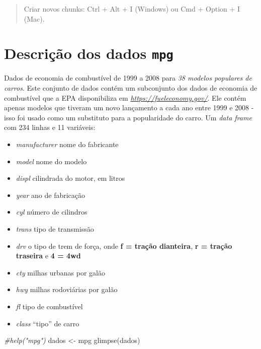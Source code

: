 \documentclass[
]{book}
\newenvironment{Shaded}{\begin{snugshade}}{\end{snugshade}}
\newcommand{\CommentTok}[1]{\textcolor[rgb]{0.56,0.35,0.01}{\textit{#1}}}
\newcommand{\FunctionTok}[1]{\textcolor[rgb]{0.00,0.00,0.00}{#1}}
\newcommand{\NormalTok}[1]{#1}
\newcommand{\OtherTok}[1]{\textcolor[rgb]{0.56,0.35,0.01}{#1}}
\begin{document}
\begin{quote}
Criar novos chunks: Ctrl + Alt + I (Windows) ou Cmd + Option + I (Mac).
\end{quote}

\hypertarget{descriuxe7uxe3o-dos-dados-mpg}{%
\section{\texorpdfstring{Descrição dos dados \texttt{mpg}}{Descrição dos dados mpg}}\label{descriuxe7uxe3o-dos-dados-mpg}}

Dados de economia de combustível de 1999 a 2008 para \emph{38 modelos populares de carros}. Este conjunto de dados contém um subconjunto dos dados de economia de combustível que a EPA disponibiliza em \emph{\url{https://fueleconomy.gov/}}. Ele contém apenas modelos que tiveram um novo lançamento a cada ano entre 1999 e 2008 - isso foi usado como um substituto para a popularidade do carro. Um \emph{data frame} com 234 linhas e 11 variáveis:

\begin{itemize}
\item
  \emph{manufacturer} nome do fabricante
\item
  \emph{model} nome do modelo
\item
  \emph{displ} cilindrada do motor, em litros
\item
  \emph{year} ano de fabricação
\item
  \emph{cyl} número de cilindros
\item
  \emph{trans} tipo de transmissão
\item
  \emph{drv} o tipo de trem de força, onde \textbf{f = tração dianteira}, \textbf{r = tração traseira} e \textbf{4 = 4wd}
\item
  \emph{cty} milhas urbanas por galão
\item
  \emph{hwy} milhas rodoviárias por galão
\item
  \emph{fl} tipo de combustível
\item
  \emph{class} ``tipo'' de carro
\end{itemize}

\begin{Shaded}
\begin{Highlighting}[]
\CommentTok{\#help("mpg")}
\NormalTok{dados }\OtherTok{\textless{}{-}}\NormalTok{ mpg}
\FunctionTok{glimpse}\NormalTok{(dados)}
\end{Highlighting}
\end{Shaded}
\end{document}
